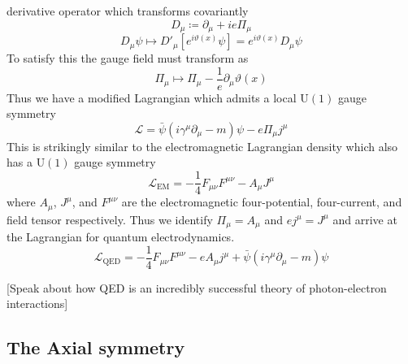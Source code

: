 \documentclass[11pt, a4paper]{article}
\theoremstyle{definition}
\theoremstyle{plain}
\begin{document}
derivative operator which transforms covariantly
\begin{equation}
  D_\mu \coloneq \partial_\mu + ie\Pi_\mu
\end{equation}
\begin{equation}
  D_\mu \psi \mapsto D'_\mu\left[e^{i\vartheta(x)}\psi\right] = e^{i\vartheta(x)}D_\mu\psi
\end{equation}
To satisfy this the gauge field must transform as
\begin{equation}
  \Pi_\mu \mapsto \Pi_\mu -\frac{1}{e}\partial_\mu\vartheta(x)
\end{equation}
Thus we have a modified Lagrangian which admits a local $\mathrm{U}(1)$ gauge symmetry
\begin{equation}
  \mathcal{L} =  \bar{\psi}(i \gamma^\mu\partial_\mu - m)\psi -e\Pi_\mu j^\mu
\end{equation}
This is strikingly similar to the electromagnetic Lagrangian density which
also has a $\mathrm{U}(1)$ gauge symmetry
\begin{equation}
  \mathcal{L}_\mathrm{EM} = -\frac{1}{4}F_{\mu\nu}F^{\mu\nu} -A_\mu J^\mu
\end{equation}
where $A_\mu$, $J^\mu$, and $F^{\mu\nu}$ are the electromagnetic four-potential, four-current,
and field tensor respectively. Thus we identify $\Pi_\mu = A_\mu$ and $ej^\mu = J^\mu$
and arrive at the Lagrangian for quantum electrodynamics.
\begin{equation}
  \mathcal{L}_\mathrm{QED} = -\frac{1}{4}F_{\mu\nu}F^{\mu\nu} -eA_\mu j^\mu
    + \bar{\psi}(i \gamma^\mu\partial_\mu - m)\psi
\end{equation}

[Speak about how QED is an incredibly successful theory of photon-electron interactions]


\subsection{The Axial symmetry}
\end{document}
